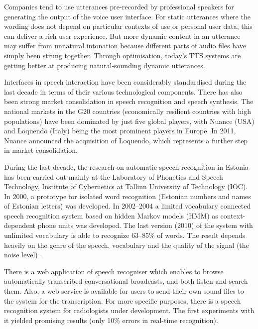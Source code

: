\begin{multicols}{2}

Companies tend to use utterances pre-recorded by professional speakers for generating the output of the voice user interface. For static utterances where the wording does not depend on particular contexts of use or personal user data, this can deliver a rich user experience. But more dynamic content in an utterance may suffer from unnatural intonation because different parts of audio files have simply been strung together. Through optimisation, today’s TTS systems are getting better at producing natural-sounding dynamic utterances.

Interfaces in speech interaction have been considerably standardised during the last decade in terms of their various technological components. There has also been strong market consolidation in speech recognition and speech synthesis. The national markets in the G20 countries (economically resilient countries with high populations) have been dominated by just five global players, with Nuance (USA) and Loquendo (Italy) being the most prominent players in Europe. In 2011, Nuance announced the acquisition of Loquendo, which represents a further step in market consolidation.

During the last decade, the research on automatic speech recognition in Estonia has been carried out mainly at the Laboratory of Phonetics and Speech Technology, Institute of Cybernetics at Tallinn University of Technology (IOC).  In 2000, a prototype for isolated word recognition (Estonian numbers and names of Estonian letters) was developed. In 2002--2004 a limited vocabulary connected speech recognition system based on hidden Markov models (HMM) as context-dependent phone units was developed.  The last version (2010) of the system with unlimited vocabulary is able to recognize 63--85\% of words.  The result depends heavily on the genre of the speech, vocabulary and the quality of the signal (the noise level) \cite{Phon}.

There is a web application of speech recogniser which enables to browse automatically transcribed conversational broadcasts, and both listen and search them.  Also, a web service is available for users to send their own sound files to the system for the transcription.  For more specific purposes, there is a speech recognition system for radiologists under development.  The first experiments with it yielded promising results (only 10\% errors in real-time recognition).


\end{multicols}
